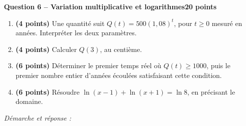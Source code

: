 \documentclass[11pt,a4paper]{article}
\begin{document}
\newpage
{\large\bfseries Question 6 -- Variation multiplicative et logarithmes}\hfill\textbf{20 points}\par
\begin{enumerate}
\item \textbf{(4 points)} Une quantité suit \(Q(t)=500(1{,}08)^t\), pour \(t\ge0\) mesuré en années. Interpréter les deux paramètres.
\item \textbf{(4 points)} Calculer \(Q(3)\), au centième.
\item \textbf{(6 points)} Déterminer le premier temps réel où \(Q(t)\ge1000\), puis le premier nombre entier d’années écoulées satisfaisant cette condition.
\item \textbf{(6 points)} Résoudre \(\ln(x-1)+\ln(x+1)=\ln8\), en précisant le domaine.
\end{enumerate}
\vspace{3mm}\textit{Démarche et réponse :}\par\vfill
\end{document}
